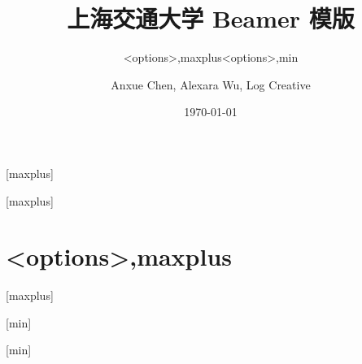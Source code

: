 \documentclass[
    aspectratio=169
]{ctexbeamer}
\begin{document}
\title[SJTU Beamer Template] %
{\textbf{上海交通大学 Beamer 模版}} %

\author[Anxue Chen, Alexara Wu, Log Creative]
{Anxue Chen, Alexara Wu, Log Creative}


\date{\today}

\subtitle{<options>,maxplus}
\logo{\resizebox{!}{0.7cm}{\zhlogo}}
[maxplus]
\maketitle
{}[maxplus]
\part{<options>,maxplus}
[maxplus]
\makebottom

\subtitle{<options>,min}
\logo{\resizebox{!}{0.7cm}{\enlogo}}
[min]
\maketitle
{}[min]
\end{document}
